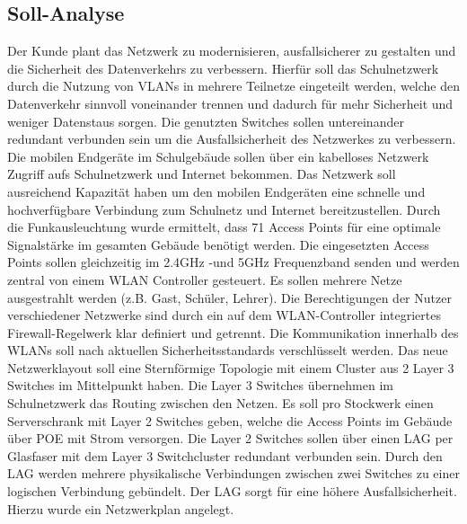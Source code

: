 \subsection{Soll-Analyse}
\label{sec:Soll-Analyse}
Der Kunde plant das Netzwerk zu modernisieren, ausfallsicherer zu gestalten und die Sicherheit des Datenverkehrs zu verbessern. Hierfür soll das Schulnetzwerk durch die Nutzung von \acs{VLAN}s in mehrere Teilnetze eingeteilt werden, welche den Datenverkehr sinnvoll voneinander trennen und dadurch für mehr Sicherheit und weniger Datenstaus sorgen. Die genutzten Switches sollen untereinander redundant verbunden sein um die Ausfallsicherheit des Netzwerkes zu verbessern. Die mobilen Endgeräte im Schulgebäude sollen über ein kabelloses Netzwerk Zugriff aufs Schulnetzwerk und Internet bekommen. Das Netzwerk soll ausreichend Kapazität haben um den mobilen Endgeräten eine schnelle und hochverfügbare Verbindung zum Schulnetz und Internet bereitzustellen. Durch die Funkausleuchtung wurde ermittelt, dass 71 Access Points für eine optimale Signalstärke im gesamten Gebäude benötigt werden.
Die eingesetzten Access Points sollen gleichzeitig im 2.4GHz -und 5GHz Frequenzband senden und werden zentral von einem WLAN Controller gesteuert.
Es sollen mehrere Netze ausgestrahlt werden (z.B. Gast, Schüler, Lehrer). 
Die Berechtigungen der Nutzer verschiedener Netzwerke sind durch ein auf dem WLAN-Controller integriertes Firewall-Regelwerk klar definiert und getrennt. 
Die Kommunikation innerhalb des WLANs soll nach aktuellen Sicherheitsstandards verschlüsselt werden. Das neue Netzwerklayout soll eine Sternförmige Topologie mit einem Cluster aus 2 Layer 3 Switches im Mittelpunkt haben. Die Layer 3 Switches übernehmen im Schulnetzwerk das Routing zwischen den Netzen. Es soll pro Stockwerk einen Serverschrank mit Layer 2 Switches geben, welche die Access Points im Gebäude über \ac{POE} mit Strom versorgen. Die Layer 2 Switches sollen über einen \ac{LAG} per Glasfaser mit dem Layer 3 Switchcluster redundant verbunden sein. Durch den LAG werden mehrere physikalische Verbindungen zwischen zwei Switches zu einer logischen Verbindung gebündelt. Der LAG sorgt für eine höhere Ausfallsicherheit. Hierzu wurde ein Netzwerkplan angelegt.

\begin{comment}
	\item Wie ist die bisherige Situation (\zB bestehende Programme, Wünsche der Mitarbeiter)?
	\item Was gilt es zu erstellen/verbessern?
\end{comment}
